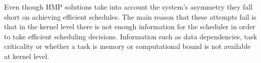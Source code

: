 Even though HMP solutions take into account the system's asymmetry they fall short on achieving efficient schedules.
The main reason that these attempts fail is that in the kernel level there is not enough information for the scheduler in order to take efficient scheduling decisions.
Information such as data dependencies, task criticality or whether a task is memory or computational bound is not available at kernel level.


%
%
%




